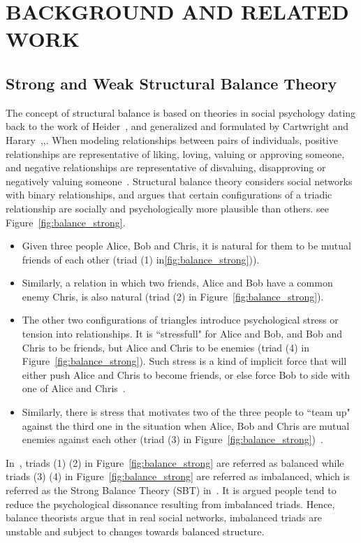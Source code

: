  
\chapter{BACKGROUND AND RELATED WORK}
\section{Strong and Weak Structural Balance Theory}
The concept of structural balance is based on theories in social psychology
dating back to the work of Heider~\cite{Heider:46}, and generalized and formulated by Cartwright and Harary~\cite{Cartwright:56},\cite{Davis:63},\cite{Harary:53}. When modeling relationships between pairs of individuals, positive
relationships are representative of liking, loving, valuing or
approving someone, and negative relationships are representative of
disvaluing, disapproving or negatively valuing
someone~\cite{Cartwright:56}. Structural balance theory considers social networks with binary relationships, and argues that certain configurations of a triadic relationship are socially and psychologically more plausible than others. see Figure~\ref{fig:balance_strong}.
\begin{itemize}
\item Given three people Alice, Bob and Chris, it is natural for them to be mutual friends of each other (triad (1) in\ref{fig:balance_strong})).
\item Similarly, a relation in which two friends, Alice and Bob have
a common enemy Chris, is also natural (triad (2) in
Figure~\ref{fig:balance_strong}).
\item The other two configurations of triangles introduce psychological stress or tension into relationships. It is ``stressfull" for Alice and Bob, and Bob
and Chris to be friends, but Alice and Chris to be enemies (triad
(4) in Figure~\ref{fig:balance_strong}). Such stress is a kind of implicit force that will either push Alice and Chris to become friends, or else force Bob to side with one of Alice and Chris~\cite{kleinberg-book}.  
\item Similarly, there is stress that motivates two of the three people to ``team up" against the third one in the situation when Alice, Bob and Chris are mutual enemies against each other (triad
(3) in Figure~\ref{fig:balance_strong})~\cite{kleinberg-book}.
\end{itemize}
In~\cite{Cartwright:56}, triads (1) (2) in Figure~\ref{fig:balance_strong} are referred as balanced while triads (3) (4) in Figure~\ref{fig:balance_strong} are referred as imbalanced, which is referred as the Strong Balance Theory (SBT) in~\cite{kleinberg-book}. It is argued people tend to reduce the psychological dissonance resulting from imbalanced triads. Hence, balance theorists argue that in real social networks, imbalanced triads are unstable and subject to changes towards balanced structure.

